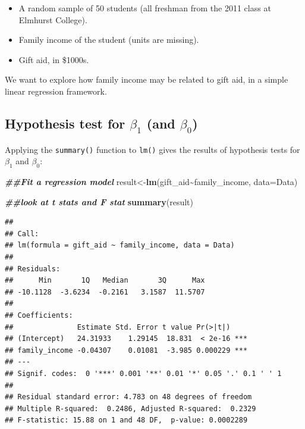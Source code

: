 \documentclass[
]{book}
\newenvironment{Shaded}{\begin{snugshade}}{\end{snugshade}}
\newcommand{\AttributeTok}[1]{\textcolor[rgb]{0.13,0.29,0.53}{#1}}
\newcommand{\DocumentationTok}[1]{\textcolor[rgb]{0.56,0.35,0.01}{\textbf{\textit{#1}}}}
\newcommand{\FunctionTok}[1]{\textcolor[rgb]{0.13,0.29,0.53}{\textbf{#1}}}
\newcommand{\NormalTok}[1]{#1}
\newcommand{\OtherTok}[1]{\textcolor[rgb]{0.56,0.35,0.01}{#1}}
\newcommand{\SpecialCharTok}[1]{\textcolor[rgb]{0.81,0.36,0.00}{\textbf{#1}}}
\providecommand{\tightlist}{%
  \setlength{\itemsep}{0pt}\setlength{\parskip}{0pt}}
\begin{document}
\begin{itemize}
\tightlist
\item
  A random sample of 50 students (all freshman from the 2011 class at Elmhurst College).
\item
  Family income of the student (units are missing).
\item
  Gift aid, in \$1000s.
\end{itemize}

We want to explore how family income may be related to gift aid, in a simple linear regression framework.

\subsection*{\texorpdfstring{Hypothesis test for \(\beta_1\) (and \(\beta_0\))}{Hypothesis test for \textbackslash beta\_1 (and \textbackslash beta\_0)}}\label{hypothesis-test-for-beta_1-and-beta_0}

Applying the \texttt{summary()} function to \texttt{lm()} gives the results of hypothesis tests for \(\beta_1\) and \(\beta_0\):

\begin{Shaded}
\begin{Highlighting}[]
\DocumentationTok{\#\#Fit a regression model}
\NormalTok{result}\OtherTok{\textless{}{-}}\FunctionTok{lm}\NormalTok{(gift\_aid}\SpecialCharTok{\textasciitilde{}}\NormalTok{family\_income, }\AttributeTok{data=}\NormalTok{Data)}

\DocumentationTok{\#\#look at t stats and F stat}
\FunctionTok{summary}\NormalTok{(result)}
\end{Highlighting}
\end{Shaded}

\begin{verbatim}
## 
## Call:
## lm(formula = gift_aid ~ family_income, data = Data)
## 
## Residuals:
##      Min       1Q   Median       3Q      Max 
## -10.1128  -3.6234  -0.2161   3.1587  11.5707 
## 
## Coefficients:
##               Estimate Std. Error t value Pr(>|t|)    
## (Intercept)   24.31933    1.29145  18.831  < 2e-16 ***
## family_income -0.04307    0.01081  -3.985 0.000229 ***
## ---
## Signif. codes:  0 '***' 0.001 '**' 0.01 '*' 0.05 '.' 0.1 ' ' 1
## 
## Residual standard error: 4.783 on 48 degrees of freedom
## Multiple R-squared:  0.2486, Adjusted R-squared:  0.2329 
## F-statistic: 15.88 on 1 and 48 DF,  p-value: 0.0002289
\end{verbatim}
\end{document}
